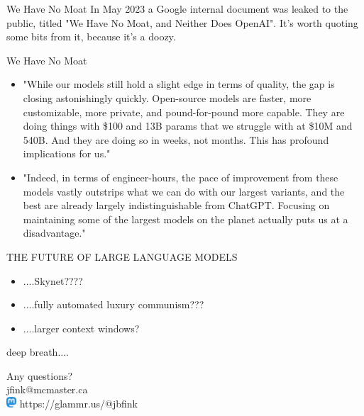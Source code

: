 \documentclass{beamer}
\begin{document}



\begin{frame}{We Have No Moat}
	In May 2023 a Google internal document was leaked to the public, titled "We Have No Moat, and Neither Does OpenAI". It's worth quoting some bits from it, because it's a doozy.
\end{frame}

\begin{frame}{We Have No Moat}
	\begin{itemize}
		\item "While our models still hold a slight edge in terms of quality, the gap is closing astonishingly quickly. Open-source models are faster, more customizable, more private, and pound-for-pound more capable. They are doing things with \$100 and 13B params that we struggle with at \$10M and 540B. And they are doing so in weeks, not months. This has profound implications for us."
		\pause
		\item "Indeed, in terms of engineer-hours, the pace of improvement from these models vastly outstrips what we can do with our largest variants, and the best are already largely indistinguishable from ChatGPT. Focusing on maintaining some of the largest models on the planet actually puts us at a disadvantage."
	\end{itemize}
\end{frame}

\begin{frame}{THE FUTURE OF LARGE LANGUAGE MODELS}
	\begin{itemize}
		\item ....Skynet????
		\pause
		\item ....fully automated luxury communism???
		\pause 
		\item ....larger context windows?
		
	\end{itemize}
	
	

\begin{frame}
	deep breath....
\end{frame}
	
	
\end{frame}

\begin{frame}
	Any questions?\\ 
	jfink@mcmaster.ca\\
	\includegraphics[left, height=4mm]{mastodon} \hspace{1mm}  https://glammr.us/@jbfink
	
\end{frame}
\end{document}
